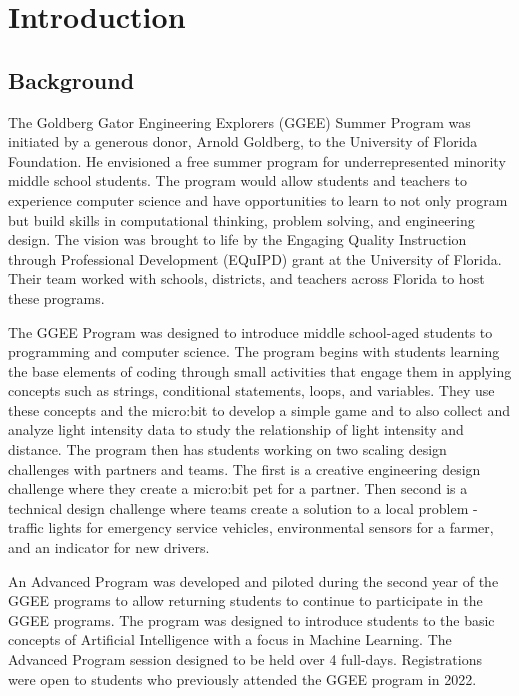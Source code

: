 \documentclass[
]{article}
\begin{document}
\hypertarget{introduction}{%
\section{Introduction}\label{introduction}}

\hypertarget{background}{%
\subsection{Background}\label{background}}

The Goldberg Gator Engineering Explorers (GGEE) Summer Program was
initiated by a generous donor, Arnold Goldberg, to the University of
Florida Foundation. He envisioned a free summer program for
underrepresented minority middle school students. The program would
allow students and teachers to experience computer science and have
opportunities to learn to not only program but build skills in
computational thinking, problem solving, and engineering design. The
vision was brought to life by the Engaging Quality Instruction through
Professional Development (EQuIPD) grant at the University of Florida.
Their team worked with schools, districts, and teachers across Florida
to host these programs.

The GGEE Program was designed to introduce middle school-aged students
to programming and computer science. The program begins with students
learning the base elements of coding through small activities that
engage them in applying concepts such as strings, conditional
statements, loops, and variables. They use these concepts and the
micro:bit to develop a simple game and to also collect and analyze light
intensity data to study the relationship of light intensity and
distance. The program then has students working on two scaling design
challenges with partners and teams. The first is a creative engineering
design challenge where they create a micro:bit pet for a partner. Then
second is a technical design challenge where teams create a solution to
a local problem - traffic lights for emergency service vehicles,
environmental sensors for a farmer, and an indicator for new drivers.

An Advanced Program was developed and piloted during the second year of
the GGEE programs to allow returning students to continue to participate
in the GGEE programs. The program was designed to introduce students to
the basic concepts of Artificial Intelligence with a focus in Machine
Learning. The Advanced Program session designed to be held over 4
full-days. Registrations were open to students who previously attended
the GGEE program in 2022.
\end{document}
